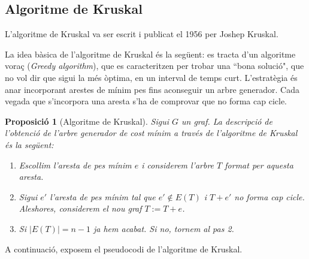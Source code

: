 \documentclass{article}
\newtheorem{prop}{Proposició}[section]
\begin{document}
\subsection{Algoritme de Kruskal}
L'algoritme de Kruskal va ser escrit i publicat el 1956 per Joshep Kruskal. \cite{11}\par
La idea bàsica de l'algoritme de Kruskal és la següent: es tracta d'un algoritme voraç (\textit{Greedy algorithm}), que es caracteritzen per trobar una ``bona solució", que no vol dir que sigui la més òptima, en un interval de temps curt. L’estratègia és anar incorporant arestes de mínim pes fins aconseguir un arbre generador. Cada vegada que s’incorpora una aresta s’ha de comprovar que no forma cap cicle.
\begin{prop}[Algoritme de Kruskal]
Sigui $G$ un graf. La descripció de l'obtenció de l'arbre generador de cost mínim a través de l'algoritme de Kruskal és la següent:
\begin{enumerate}
    \item Escollim l'aresta de pes mínim $e$ i considerem l'arbre $T$ format per aquesta aresta.
    \item Sigui $e'$ l’aresta de pes mínim tal que $e'\notin E(T)$ i $T+e'$ no forma cap cicle. Aleshores, considerem el nou graf $T:=T+e$.
    \item Si $|E(T)|=n-1$ ja hem acabat. Si no, tornem al pas 2.
\end{enumerate}
\end{prop}
A continuació, exposem el pseudocodi de l'algoritme de Kruskal.
\end{document}

